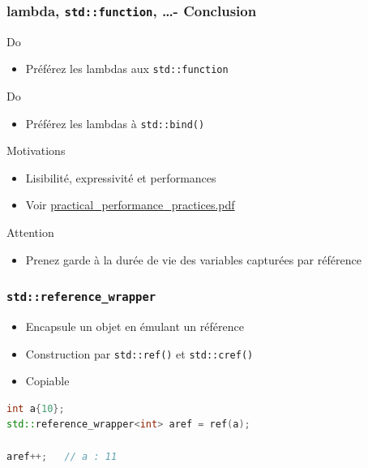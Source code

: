 \documentclass[C++.tex]{subfiles}
\begin{document}
\begin{frame}[fragile]
	\frametitle{lambda, \lstinline|std::function|, \ldots - Conclusion}
	\begin{exampleblock}{Do}
		\begin{itemize}
			\item Préférez les lambdas aux \lstinline|std::function|
		\end{itemize}
	\end{exampleblock}

	\begin{exampleblock}{Do}
		\begin{itemize}
			\item Préférez les lambdas à \lstinline|std::bind()|
		\end{itemize}
	\end{exampleblock}


	\begin{block}{Motivations}
		\begin{itemize}
			\item Lisibilité, expressivité et performances
			\item Voir \href{https://github.com/boostcon/cppnow_presentations_2016/blob/master/00_tuesday/practical_performance_practices.pdf}{practical\_performance\_practices.pdf}
		\end{itemize}

	\end{block}

	\begin{alertblock}{Attention}
		\begin{itemize}
			\item Prenez garde à la durée de vie des variables capturées par référence
		\end{itemize}
	\end{alertblock}
\end{frame}

\begin{frame}[fragile]
	\frametitle{\lstinline|std::reference_wrapper|}
	\begin{itemize}
		\item Encapsule un objet en émulant un référence
		\item Construction par \lstinline|std::ref()| et \lstinline|std::cref()|
		\item Copiable
	\end{itemize}

	\begin{lstlisting}[language=C++]
int a{10};
std::reference_wrapper<int> aref = ref(a);

aref++;   // a : 11\end{lstlisting}
\end{frame}
\end{document}

